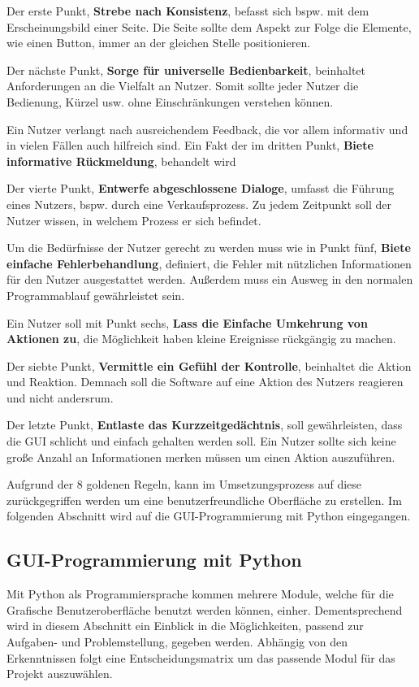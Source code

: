 \documentclass[a4paper,titlepage,halfparskip,12pt]{scrreprt}
\begin{document}
\begin{onehalfspacing}
Der erste Punkt, \textbf{Strebe nach Konsistenz}, befasst sich bspw. mit dem Erscheinungsbild einer Seite. Die Seite sollte dem Aspekt zur Folge die Elemente, wie einen Button, immer an der gleichen Stelle positionieren.

Der nächste Punkt, \textbf{Sorge für universelle Bedienbarkeit}, beinhaltet Anforderungen an die Vielfalt an Nutzer. Somit sollte jeder Nutzer die Bedienung, Kürzel usw. ohne Einschränkungen verstehen können.

Ein Nutzer verlangt nach ausreichendem Feedback, die vor allem informativ und in vielen Fällen auch hilfreich sind. Ein Fakt der im dritten Punkt, \textbf{Biete informative Rückmeldung}, behandelt wird

Der vierte Punkt, \textbf{Entwerfe abgeschlossene Dialoge}, umfasst die Führung eines Nutzers, bspw. durch eine Verkaufsprozess. Zu jedem Zeitpunkt soll der Nutzer wissen, in welchem Prozess er sich befindet.

Um die Bedürfnisse der Nutzer gerecht zu werden muss wie in Punkt fünf, \textbf{Biete einfache Fehlerbehandlung}, definiert, die Fehler mit nützlichen Informationen für den Nutzer ausgestattet werden. Außerdem muss ein Ausweg in den normalen Programmablauf gewährleistet sein.

Ein Nutzer soll mit Punkt sechs, \textbf{Lass die Einfache Umkehrung von Aktionen zu}, die Möglichkeit haben kleine Ereignisse rückgängig zu machen.

Der siebte Punkt, \textbf{Vermittle ein Gefühl der Kontrolle}, beinhaltet die Aktion und Reaktion. Demnach soll die Software auf eine Aktion des Nutzers reagieren und nicht andersrum. 

Der letzte Punkt, \textbf{Entlaste das Kurzzeitgedächtnis}, soll gewährleisten, dass die GUI schlicht und einfach gehalten werden soll. Ein Nutzer sollte sich keine große Anzahl an Informationen merken müssen um einen Aktion auszuführen.
\cite{UI8Regeln2019}

Aufgrund der 8 goldenen Regeln, kann im Umsetzungsprozess auf diese zurückgegriffen werden um eine benutzerfreundliche Oberfläche zu erstellen. Im folgenden Abschnitt wird auf die \ac{GUI}-Programmierung mit Python eingegangen.


\subsection{GUI-Programmierung mit Python}
\label{subsec:GuiPython}
Mit Python als Programmiersprache kommen mehrere Module, welche für die Grafische Benutzeroberfläche benutzt werden können, einher. Dementsprechend wird in diesem Abschnitt ein Einblick in die Möglichkeiten, passend zur Aufgaben- und Problemstellung, gegeben werden. Abhängig von den Erkenntnissen folgt eine Entscheidungsmatrix um das passende Modul für das Projekt auszuwählen.


\end{onehalfspacing}
\end{document}
